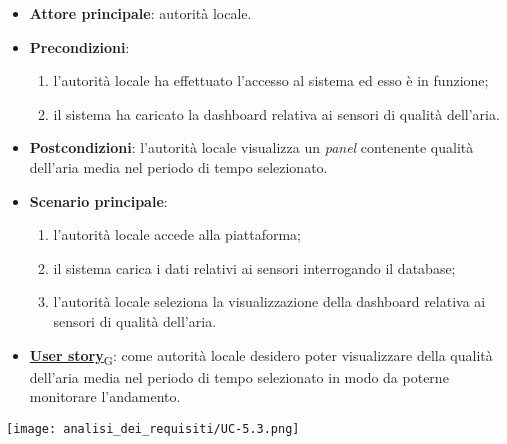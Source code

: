 \begin{itemize}
	\item \textbf{Attore principale}: autorità locale.
	\item \textbf{Precondizioni}:
	      \begin{enumerate}
		      \item l'autorità locale ha effettuato l'accesso al sistema ed esso è in funzione;
		      \item il sistema ha caricato la dashboard relativa ai sensori di qualità dell'aria.
	      \end{enumerate}
	\item \textbf{Postcondizioni}: l'autorità locale visualizza un \textit{panel} contenente qualità dell'aria media nel periodo di tempo selezionato.
	\item \textbf{Scenario principale}:
	      \begin{enumerate}
		      \item l'autorità locale accede alla piattaforma;
		      \item il sistema carica i dati relativi ai sensori interrogando il database;
		      \item l'autorità locale seleziona la visualizzazione della dashboard relativa ai sensori di qualità dell'aria.
	      \end{enumerate}
	\item \href{https://7last.github.io/docs/rtb/documentazione-interna/glossario\#user-story}{\textbf{User story}\textsubscript{G}}: come autorità locale desidero poter visualizzare della qualità dell'aria media nel periodo di tempo selezionato
	      in modo da poterne monitorare l'andamento.
\end{itemize}
\begin{center}
	\texttt{[image: analisi\_dei\_requisiti/UC-5.3.png]}
\end{center}


